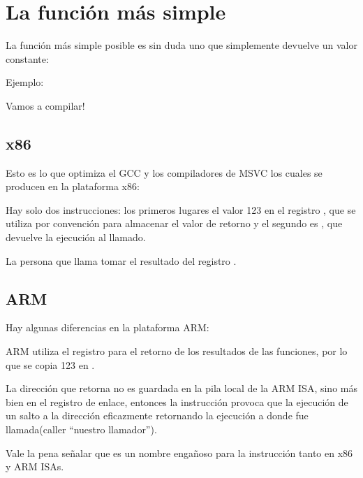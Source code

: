 \chapter{La función más simple}

La función más simple posible es sin duda uno que simplemente devuelve un valor constante:

Ejemplo:



Vamos a compilar!

\section{x86}

Esto es lo que optimiza el GCC  y los compiladores de MSVC los cuales se producen en la plataforma x86:



Hay solo dos instrucciones: los primeros lugares el valor 123 en el registro \EAX, que se utiliza por convención para almacenar el valor de retorno y el segundo es \RET, que devuelve la ejecución al llamado.

La persona que llama tomar el resultado del registro \EAX.

\ifdefined\IncludeARM
\section{ARM}

Hay algunas diferencias en la plataforma ARM:



ARM utiliza el registro  para el retorno de los resultados de las funciones, por lo que se copia 123 en .

La dirección que retorna no es guardada en la pila local de la ARM \ac{ISA}, sino más bien en el registro de enlace,
entonces la instrucción  provoca que la ejecución de un salto a la dirección eficazmente retornando la ejecución a donde fue llamada(caller ``nuestro llamador'').
\fi %

Vale la pena señalar que \MOV es un nombre engañoso para la instrucción tanto en x86 y ARM \ac{ISA}s.

